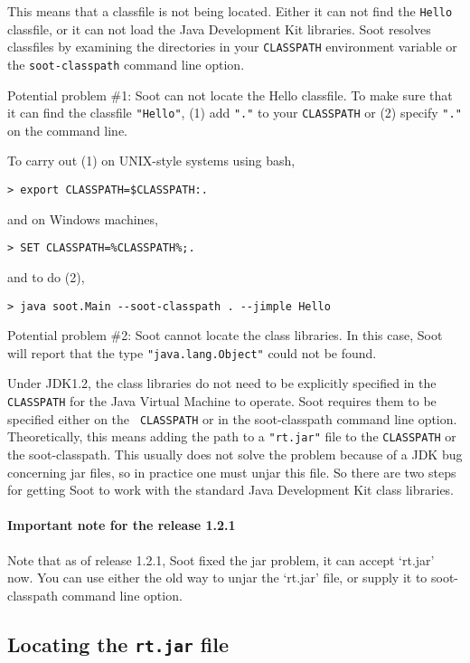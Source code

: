 \documentclass{article}
\begin{document}
This means that a classfile is not being located.  Either it can not
find the {\tt Hello} classfile, or it can not load the Java
Development Kit libraries.  Soot resolves classfiles by examining the
directories in your {\tt CLASSPATH} environment variable or the
{\tt soot-classpath} command line option.

Potential problem \#1: Soot can not locate the Hello classfile. To make
sure that it can find the classfile {\tt "Hello"}, (1) add {\tt "."} 
to your {\tt CLASSPATH} or (2) specify {\tt "."} on the command line.

To carry out (1) on UNIX-style systems using bash,
\begin{verbatim}
> export CLASSPATH=$CLASSPATH:.
\end{verbatim}
and on Windows machines,
\begin{verbatim}
> SET CLASSPATH=%CLASSPATH%;.
\end{verbatim}

and to do (2), 
\begin{verbatim}
> java soot.Main --soot-classpath . --jimple Hello
\end{verbatim}

Potential problem \#2: Soot cannot locate the class libraries.  In this
case, Soot will report that the type {\tt "java.lang.Object"} could not
be found.

Under JDK1.2, the class libraries do not need to be explicitly
specified in the {\tt CLASSPATH} for the Java Virtual Machine to
operate.  Soot requires them to be specified either on the {\tt
CLASSPATH} or in the soot-classpath command line option.
Theoretically, this means adding the path to a {\tt "rt.jar"} file to the
{\tt CLASSPATH} or the soot-classpath.  This usually does not solve the
problem because of a JDK bug concerning jar files, so in practice one
must unjar this file.  So there are two steps for getting Soot to work
with the standard Java Development Kit class libraries.

\paragraph{Important note for the release 1.2.1} Note that as of release 1.2.1,
Soot fixed the jar problem, it can accept `rt.jar' now. You can use either the 
old way to unjar the `rt.jar' file, or supply it to soot-classpath command line 
option.

\subsection{Locating the {\tt rt.jar} file}
\end{document}
